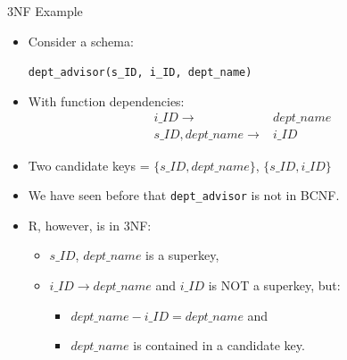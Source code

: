 \documentclass{beamer}
\begin{document}
\begin{frame}{3NF Example}
    \begin{itemize}
        \item Consider a schema:
            \begin{center}
                \texttt{dept\_advisor(s\_ID, i\_ID, dept\_name)}
            \end{center}
        \item With function dependencies:
            \begin{equation*}
                \begin{align*}
                    i\_ID \rightarrow& dept\_name \\
                    s\_ID, dept\_name \rightarrow& i\_ID
                \end{align*}
            \end{equation*}
        \item Two candidate keys = $\{s\_ID, dept\_name\}$, $\{s\_ID, i\_ID\}$
        \item We have seen before that \texttt{dept\_advisor} is not in BCNF.
        \item R, however, is in 3NF:
            \begin{itemize}
                \item $s\_ID$, $dept\_name$ is a superkey,
                \item $i\_ID \rightarrow dept\_name$ and $i\_ID$ is NOT a superkey, but:
                    \begin{itemize}
                        \item ${dept\_name} - {i\_ID} = {dept\_name}$ and
                        \item $dept\_name$ is contained in a candidate key.
                    \end{itemize}
            \end{itemize}
    \end{itemize}
\end{frame}
\end{document}
